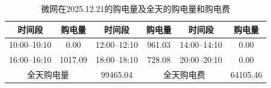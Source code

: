 \documentclass[UTF8]{ctexart}
\begin{document}
    \begin{table}[htbp]
        \centering
        \caption{微网在2025.12.21的购电量及全天的购电量和购电费}
        \label{tab:q3_tenminute_1221}
        \begin{tabular}{cccccc}
            \toprule
            时间段 & 购电量 & 时间段 & 购电量 & 时间段 & 购电量 \\
            \midrule
            10:00--10:10 & 0.00 &
            12:00--12:10 & 961.03 &
            14:00--14:10 & 0.00 \\
            16:00--16:10 & 1017.09 &
            18:00--18:10 & 728.08 &
            20:00--20:10 & 0.00 \\
            \midrule
            \multicolumn{2}{c}{全天购电量} & 99465.04 &
            \multicolumn{2}{c}{全天购电费} & 64105.46 \\
            \bottomrule
        \end{tabular}
    \end{table}
    
\end{document}
